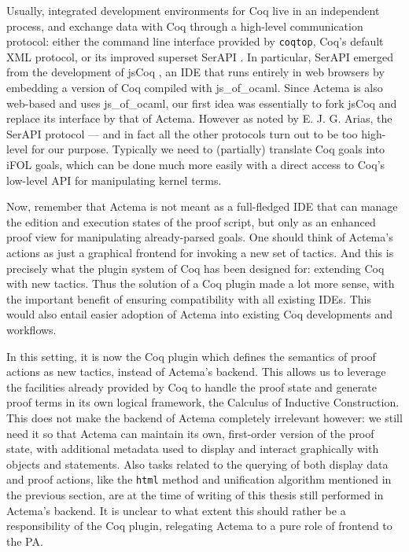 Usually, integrated development environments for Coq live in an independent
process, and exchange data with Coq through a high-level communication protocol:
either the command line interface provided by \texttt{coqtop}, Coq's default XML
protocol, or its improved superset SerAPI .
In particular, SerAPI emerged from the development of jsCoq
, an IDE that runs entirely in web browsers by
embedding a version of Coq compiled with js\_of\_ocaml. Since Actema is also
web-based and uses js\_of\_ocaml, our first idea was essentially to fork jsCoq
and replace its interface by that of Actema. However as noted by E. J. G. Arias,
the SerAPI protocol --- and in fact all the other protocols turn out to be too
high-level for our purpose. Typically we need to (partially) translate Coq goals
into iFOL goals, which can be done much more easily with a direct access to
Coq's low-level API for manipulating kernel terms.

Now, remember that Actema is not meant as a full-fledged IDE that can manage the
edition and execution states of the proof script, but only as an enhanced proof
view for manipulating already-parsed goals. One should think of Actema's actions
as just a graphical frontend for invoking a new set of tactics. And this is
precisely what the plugin system of Coq has been designed for: extending Coq
with new tactics. Thus the solution of a Coq plugin made a lot more sense, with
the important benefit of ensuring compatibility with all existing IDEs. This
would also entail easier adoption of Actema into existing Coq developments and
workflows.

In this setting, it is now the Coq plugin which defines the semantics of proof
actions as new tactics, instead of Actema's backend. This allows us to leverage
the facilities already provided by Coq to handle the proof state and generate
proof terms in its own logical framework, the Calculus of Inductive
Construction. This does not make the backend of Actema completely irrelevant
however: we still need it so that Actema can maintain its own, first-order
version of the proof state, with additional metadata used to display and
interact graphically with objects and statements. Also tasks related to the
querying of both display data and proof actions, like the \texttt{html} method
and unification algorithm mentioned in the previous section, are at the time of
writing of this thesis still performed in Actema's backend. It is unclear to
what extent this should rather be a responsibility of the Coq plugin, relegating
Actema to a pure role of frontend to the PA.

